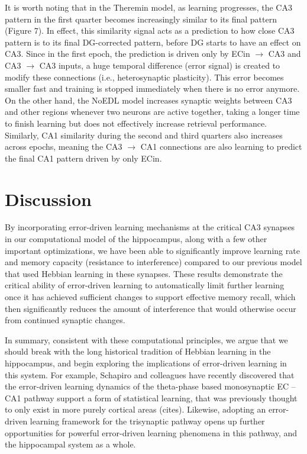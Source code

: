 \documentclass[11pt,twoside]{article}
\newif\myifpdf
\begin{document}
It is worth noting that in the Theremin model, as learning progresses, the CA3 pattern in the first quarter becomes increasingly similar to its final pattern (Figure 7). In effect, this similarity signal acts as a prediction to how close CA3 pattern is to its final DG-corrected pattern, before DG starts to have an effect on CA3. Since in the first epoch, the prediction is driven only by ECin $\rightarrow$ CA3 and CA3 $\rightarrow$ CA3 inputs, a huge temporal difference (error signal) is created to modify these connections (i.e., heterosynaptic plasticity). This error becomes smaller fast and training is stopped immediately when there is no error anymore. On the other hand, the NoEDL model increases synaptic weights between CA3 and other regions whenever two neurons are active together, taking a longer time to finish learning but does not effectively increase retrieval performance. Similarly, CA1 similarity during the second and third quarters also increases across epochs, meaning the CA3 $\rightarrow$ CA1 connections are also learning to predict the final CA1 pattern driven by only ECin. 

\section{Discussion}

By incorporating error-driven learning mechanisms at the critical CA3 synapses in our computational model of the hippocampus, along with a few other important optimizations, we have been able to significantly improve learning rate and memory capacity (resistance to interference) compared to our previous model that used Hebbian learning in these synapses. These results demonstrate the critical ability of error-driven learning to automatically limit further learning once it has achieved sufficient changes to support effective memory recall, which then significantly reduces the amount of interference that would otherwise occur from continued synaptic changes.

In summary, consistent with these computational principles, we argue that we should break with the long historical tradition of Hebbian learning in the hippocampus, and begin exploring the implications of error-driven learning in this system.  For example, Schapiro and colleagues have recently discovered that the error-driven learning dynamics of the theta-phase based monosynaptic EC -- CA1 pathway support a form of statistical learning, that was previously thought to only exist in more purely cortical areas (cites).  Likewise, adopting an error-driven learning framework for the trisynaptic pathway opens up further opportunities for powerful error-driven learning phenomena in this pathway, and the hippocampal system as a whole.
\end{document}
